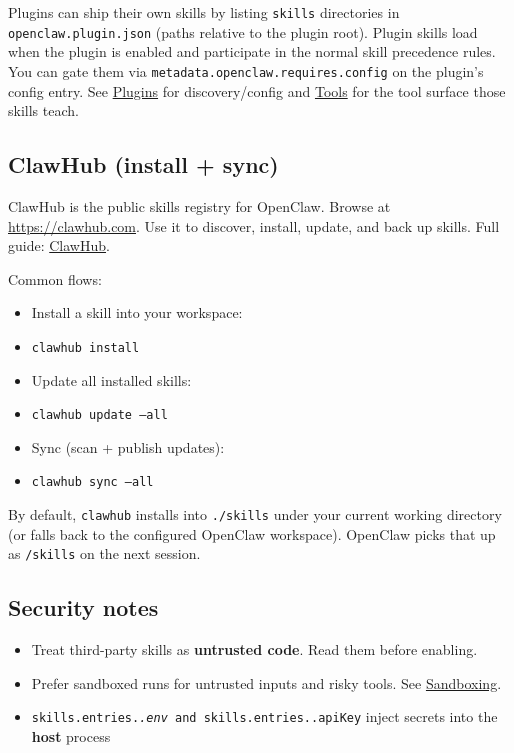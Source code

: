 Plugins can ship their own skills by listing \texttt{skills} directories in
\texttt{openclaw.plugin.json} (paths relative to the plugin root). Plugin skills load
when the plugin is enabled and participate in the normal skill precedence rules.
You can gate them via \texttt{metadata.openclaw.requires.config} on the plugin’s config
entry. See \href{/tools/plugin}{Plugins} for discovery/config and \href{/tools}{Tools} for the
tool surface those skills teach.

\subsection{ClawHub (install + sync)}


ClawHub is the public skills registry for OpenClaw. Browse at
\href{https://clawhub.com}{https://clawhub.com}. Use it to discover, install, update, and back up skills.
Full guide: \href{/tools/clawhub}{ClawHub}.

Common flows:

\begin{itemize}
  \item Install a skill into your workspace:
  \item \texttt{clawhub install }
  \item Update all installed skills:
  \item \texttt{clawhub update --all}
  \item Sync (scan + publish updates):
  \item \texttt{clawhub sync --all}
\end{itemize}


By default, \texttt{clawhub} installs into \texttt{./skills} under your current working
directory (or falls back to the configured OpenClaw workspace). OpenClaw picks
that up as \texttt{/skills} on the next session.

\subsection{Security notes}


\begin{itemize}
  \item Treat third-party skills as \textbf{untrusted code}. Read them before enabling.
  \item Prefer sandboxed runs for untrusted inputs and risky tools. See \href{/gateway/sandboxing}{Sandboxing}.
  \item \texttt{skills.entries.\textit{.env} and \texttt{skills.entries.}.apiKey} inject secrets into the \textbf{host} process
\end{itemize}

